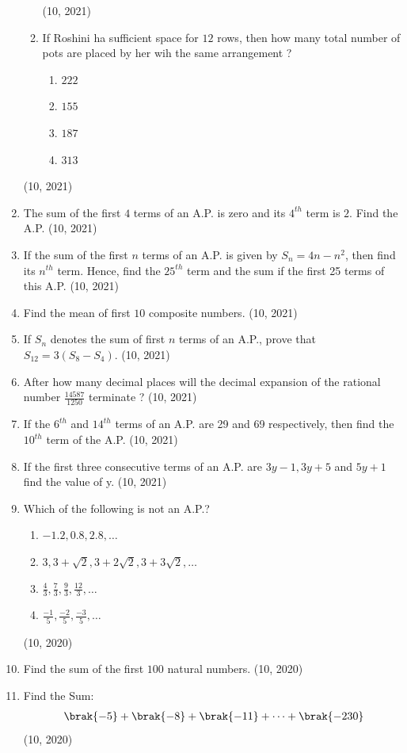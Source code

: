 \begin{enumerate}[label=\thesubsection.\arabic*,ref=\thesubsection.\theenumi,itemsep=1pt]
\begin{enumerate}[label=(\roman*)]
			\hfill (10, 2021) \item If Roshini ha sufficient space for $12$ rows, then how many total number of pots are placed by her wih the same arrangement ?
				\begin{enumerate}[label=\Alph*]
					 \item $222$
					 \item $155$
					 \item $187$
					 \item $313$
				\end{enumerate}
		\end{enumerate} 
\hfill (10, 2021)
	 \item The sum of the first $4$ terms of an A.P. is zero and its $4^{th}$ term is $2$. Find the A.P.
	\hfill (10, 2021) \item If the sum of the first $n$ terms of an A.P. is given by $S_n = 4n - n^2$, then find its $n^{th}$ term. Hence, find the $25^{th}$ term and the sum if the first 25 terms of this A.P.
\hfill (10, 2021)
	 \item Find the mean of first $10$ composite numbers.
	\hfill (10, 2021) \item If $S_n$ denotes the sum of first $n$ terms of an A.P., prove that $S_{12} = 3(S_8 - S_4)$.
	\hfill (10, 2021) \item After how many decimal places will the decimal expansion of the rational number $\frac{14587}{1250}$ terminate ?			
\hfill (10, 2021)
	 \item If the $6^{th}$ and $14^{th}$ terms of an A.P. are 29 and 69 respectively, then find the $10^{th}$ term of the A.P.
	\hfill (10, 2021) \item If the first three consecutive terms of an A.P. are $3y-1, 3y+5$ and $5y+1$ find the value of y. 
\hfill (10, 2021)
 \item Which of the following is not an A.P.? 
\begin{enumerate}[label =(\Alph*)]
               \item $-1.2,0.8,2.8,\dots$ 
	        \item $3,3+\sqrt2,3+2\sqrt2,3+3\sqrt2,\dots$ 
	        \item $\frac{4}{3},\frac{7}{3},\frac{9}{3},\frac{12}{3},\dots$ 
	        \item $\frac{-1}{5},\frac{-2}{5},\frac{-3}{5},\dots$ 
\end{enumerate}

\hfill (10, 2020) \item Find the sum of the first $100$ natural numbers.	
	\hfill (10, 2020)
 \item Find the Sum:
\begin{align*}
	\brak{-5} + \brak{-8} + \brak{-11} + \dots + \brak{-230}
\end{align*}
\hfill (10, 2020)


\end{enumerate}
